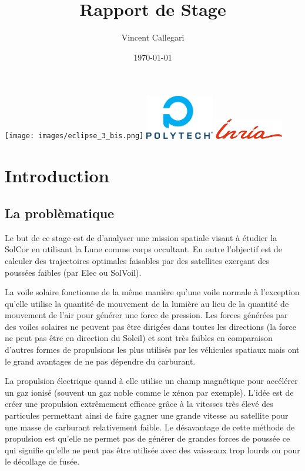 \documentclass[11pt]{article} %
\title{Rapport de Stage} %
\author{Vincent Callegari} %
\date{\today} %
\begin{document}
		\maketitle
		\texttt{[image: images/eclipse\_3\_bis.png]}
		\vfill
		\includegraphics[width=3cm]{images/Logo_Reseau_Polytech.png} \hfill \includegraphics[width=3cm]{images/inria.png}
		\newpage
		\tableofcontents
		\newpage
		\section{Introduction}
		
		\subsection{La problèmatique}
		Le but de ce stage est de d'analyser une mission spatiale visant à étudier la \gls{SolCor} en utilisant la Lune comme corps occultant. En outre l'objectif est de calculer des trajectoires optimales faisables par des satellites exerçant des poussées faibles (par \gls{Elec} ou \gls{SolVoil}).
		
		La voile solaire fonctionne de la même manière qu'une voile normale à l'exception qu'elle utilise la quantité de mouvement de la lumière au lieu de la quantité de mouvement de l'air pour générer une force de pression. Les forces générées par des voiles solaires ne peuvent pas être dirigées dans toutes les directions (la force ne peut pas être en direction du Soleil) et sont très faibles en comparaison d'autres formes de propulsions les plus utilisés par les véhicules spatiaux mais ont le grand avantages de ne pas dépendre du carburant.
		
		La propulsion électrique quand à elle utilise un champ magnétique pour accélérer un gaz ionisé (souvent un gaz noble comme le xénon par exemple). L'idée est de créer une propulsion extrêmement efficace grâce à la vitesses très élevé des particules permettant ainsi de faire gagner une grande vitesse au satellite pour une masse de carburant relativement faible. Le désavantage de cette méthode de propulsion est qu'elle ne permet pas de générer de grandes forces de poussée ce qui signifie qu'elle ne peut pas être utilisée avec des vaisseaux trop lourds ou pour le décollage de fusée.
		
\end{document}
